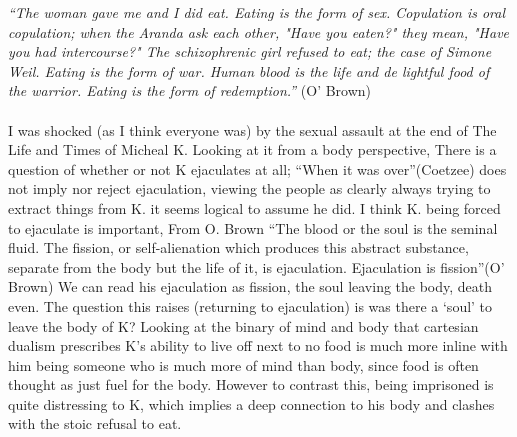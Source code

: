 
\textit{``The woman gave me and I did eat. Eating is the form of sex. Copulation is oral copulation; when the Aranda ask each other, "Have you eaten?" they mean, "Have you had intercourse?" The schizophrenic girl refused to eat; the case of Simone Weil. Eating is the form of war. Human blood is the life and de lightful food of the warrior. Eating is the form of redemption.''} (O' Brown)
\paragraph{}

I was shocked (as I think everyone was) by the sexual assault at the end of The Life and Times of Micheal K. Looking at it from a body perspective, There is a question of whether or not K ejaculates at all; ``When it was over''(Coetzee) does not imply nor reject ejaculation, viewing the people as clearly always trying to extract things from K. it seems logical to assume he did.  I think K. being forced to ejaculate is important, From O. Brown ``The blood or the soul is the seminal fluid. The fission, or self-alienation which produces this abstract substance, separate from the body but the life of it, is ejaculation. Ejaculation is fission''(O' Brown) We can read his ejaculation as fission, the soul leaving the body, death even. The question this raises (returning to ejaculation) is was there a `soul' to leave the body of K? Looking at the binary of mind and body that cartesian dualism prescribes K's ability to live off next to no food is much more inline with him being someone who is much more of mind than body, since food is often thought as just fuel for the body. However to contrast this, being imprisoned is quite distressing to K, which implies a deep connection to his body and clashes with the stoic refusal to eat.



